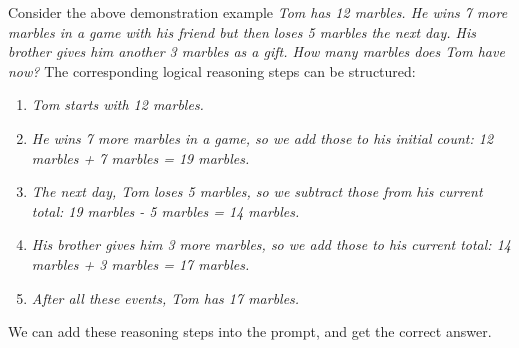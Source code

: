 Consider the above demonstration example
\textit{Tom has 12 marbles. He wins 7 more marbles in a game with his friend but then loses 5 marbles the next day. His brother gives him another 3 marbles as a gift. How many marbles does Tom have now?} The corresponding logical reasoning steps can be structured:
\begin{enumerate}[leftmargin=3.5em]
\item[Step 1:] \vspace{0.3em} \textit{Tom starts with 12 marbles.}
\item[Step 2:] \vspace{0.1em} \textit{He wins 7 more marbles in a game, so we add those to his initial count: 12 marbles + 7 marbles = 19 marbles.}
\item[Step 3:] \vspace{0.1em} \textit{The next day, Tom loses 5 marbles, so we subtract those from his current total: 19 marbles - 5 marbles = 14 marbles.}
\item[Step 4:] \vspace{0.1em} \textit{His brother gives him 3 more marbles, so we add those to his current total: 14 marbles + 3 marbles = 17 marbles.}
\item[Step 5:] \vspace{0.1em} \textit{After all these events, Tom has 17 marbles.}
\end{enumerate}
\vspace{0.5em}

We can add these reasoning steps into the prompt, and get the correct answer.

